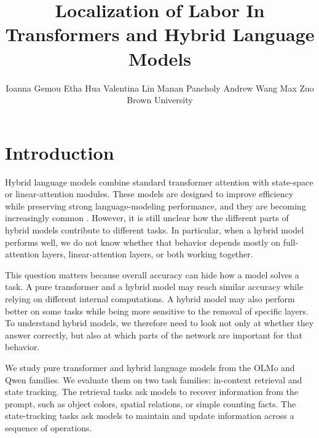 \documentclass{article}
\title{Localization of Labor In Transformers and Hybrid Language Models}
\author{%
  Ioanna Gemou \quad
  Etha Hua \quad
  Valentina Lin \quad
  Manan Pancholy \quad
  Andrew Wang \quad
  Max Zuo \\
  Brown University
}
\begin{document}
\maketitle
    




\section{Introduction}
\label{sec:intro}

Hybrid language models combine standard transformer attention with state-space or linear-attention modules. These models are designed to improve efficiency while preserving strong language-modeling performance, and they are becoming increasingly common \citep{merrill2026olmohybridtheorypractice, qwen35blog, chandiramani2026nemotron}. However, it is still unclear how the different parts of hybrid models contribute to different tasks. In particular, when a hybrid model performs well, we do not know whether that behavior depends mostly on full-attention layers, linear-attention layers, or both working together.

This question matters because overall accuracy can hide how a model solves a task. A pure transformer and a hybrid model may reach similar accuracy while relying on different internal computations. A hybrid model may also perform better on some tasks while being more sensitive to the removal of specific layers. To understand hybrid models, we therefore need to look not only at whether they answer correctly, but also at which parts of the network are important for that behavior.

We study pure transformer and hybrid language models from the OLMo and Qwen families. We evaluate them on two task families: in-context retrieval and state tracking. The retrieval tasks ask models to recover information from the prompt, such as object colors, spatial relations, or simple counting facts. The state-tracking tasks ask models to maintain and update information across a sequence of operations.
\end{document}
